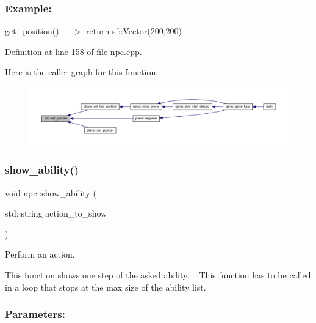 \subsubsection*{Example\+: }

\hyperlink{classnpc_af58658444d25eaa77aec883dd9d5592d}{get\+\_\+position()} ~\newline
-\/$>$ return sf\+::\+Vector(200,200) 

Definition at line 158 of file npc.\+cpp.

Here is the caller graph for this function\+:
\nopagebreak
\begin{figure}[H]
\begin{center}
\leavevmode
\includegraphics[width=350pt]{classnpc_a52d22585e441af4d8dde1d1a2658b2dc_icgraph}
\end{center}
\end{figure}
\mbox{\label{classnpc_a2a5bbed340b918265dabc2dcfb5d07b6}} 
\subsubsection{\texorpdfstring{show\+\_\+ability()}{show\_ability()}}
{\footnotesize\ttfamily void npc\+::show\+\_\+ability (\begin{DoxyParamCaption}\item[{std\+::string}]{action\+\_\+to\+\_\+show }\end{DoxyParamCaption})}



Perform an action. 

This function shows one step of the asked ability. ~\newline
This function has to be called in a loop that stops at the max size of the ability list. ~\newline


\subsubsection*{Parameters\+: }

